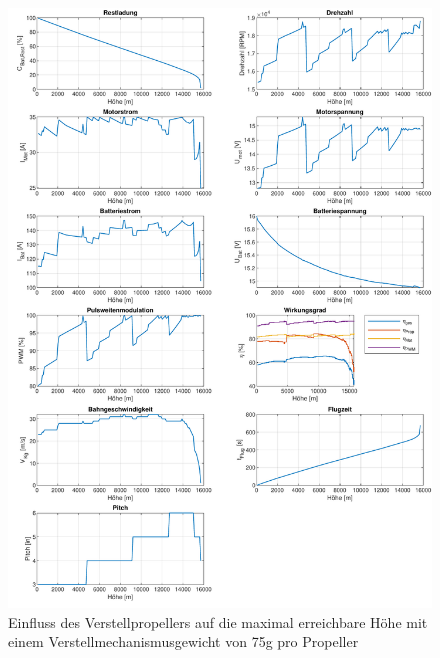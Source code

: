 \begin{appendix}
\begin{figure}[H]
\centering
	\includegraphics[scale=0.7]{Diagramme/Verstellprop_real.pdf}
	\caption{Einfluss des Verstellpropellers auf die maximal erreichbare Höhe mit einem Verstellmechanismusgewicht von 75g pro Propeller}
	\label{abb:verstellprop_real}
\end{figure}



\end{appendix}
